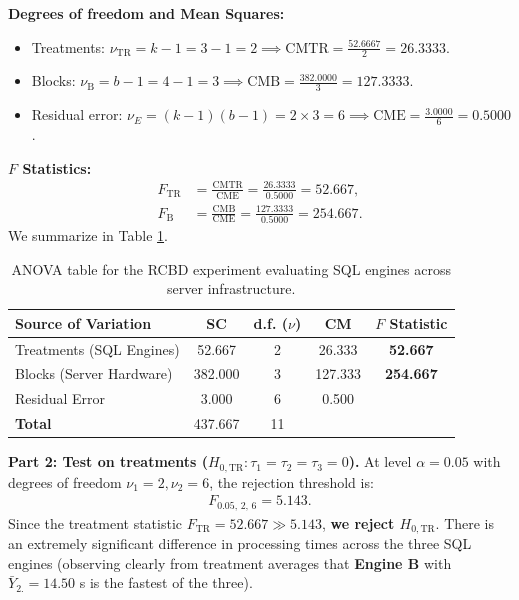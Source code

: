 \begin{solproblema}
	\textbf{Degrees of freedom and Mean Squares:}
	\begin{itemize}
		\item Treatments: $\nu_{\text{TR}} = k - 1 = 3 - 1 = 2 \implies \text{CMTR} = \frac{52.6667}{2} = 26.3333$.
		\item Blocks: $\nu_{\text{B}} = b - 1 = 4 - 1 = 3 \implies \text{CMB} = \frac{382.0000}{3} = 127.3333$.
		\item Residual error: $\nu_E = (k-1)(b-1) = 2 \times 3 = 6 \implies \text{CME} = \frac{3.0000}{6} = 0.5000$.
	\end{itemize}
	
	\textbf{$F$ Statistics:}
	\begin{align}
		F_{\text{TR}} &= \frac{\text{CMTR}}{\text{CME}} = \frac{26.3333}{0.5000} = 52.667, \\
		F_{\text{B}} &= \frac{\text{CMB}}{\text{CME}} = \frac{127.3333}{0.5000} = 254.667.
	\end{align}
	We summarize in Table \ref{tab:anova_dbca_sol}.
	\begin{table}[h!]
		\centering
		\begin{tabular}{lcccc}
			\hline
			\textbf{Source of Variation} & \textbf{SC} & \textbf{d.f. ($\nu$)} & \textbf{CM} & \textbf{$F$ Statistic} \\ \hline
			Treatments (SQL Engines) & 52.667 & 2 & 26.333 & \textbf{52.667} \\
			Blocks (Server Hardware) & 382.000 & 3 & 127.333 & \textbf{254.667} \\
			Residual Error & 3.000 & 6 & 0.500 & \\ \hline
			\textbf{Total} & 437.667 & 11 & & \\ \hline
		\end{tabular}
		\caption{ANOVA table for the RCBD experiment evaluating SQL engines across server infrastructure.}
		\label{tab:anova_dbca_sol}
	\end{table}
	
	\textbf{Part 2: Test on treatments ($H_{0,\text{TR}}: \tau_1 = \tau_2 = \tau_3 = 0$).}
	At level $\alpha = 0.05$ with degrees of freedom $\nu_1 = 2, \nu_2 = 6$, the rejection threshold is:
	\begin{align}
		F_{0.05, \, 2, \, 6} = 5.143.
	\end{align}
	Since the treatment statistic $F_{\text{TR}} = 52.667 \gg 5.143$, \textbf{we reject $H_{0,\text{TR}}$}. There is an extremely significant difference in processing times across the three SQL engines (observing clearly from treatment averages that \textbf{Engine B} with $\bar{Y}_{2.} = 14.50$ s is the fastest of the three).
	

\end{solproblema}
